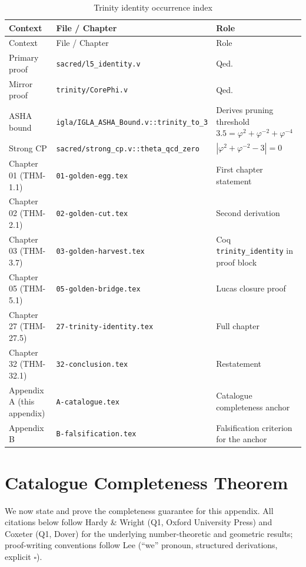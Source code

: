 \begin{longtable}{llp{5.5cm}}
\toprule
Context & File / Chapter & Role \\
\midrule
\endfirsthead
\toprule
Context & File / Chapter & Role \\
\midrule
\endhead
\bottomrule
\endfoot
\bottomrule
\caption{Trinity identity occurrence index}
\endlastfoot
Primary proof &
  \texttt{sacred/l5\_identity.v} & Qed. \\
Mirror proof &
  \texttt{trinity/CorePhi.v} & Qed. \\
ASHA bound &
  \texttt{igla/IGLA\_ASHA\_Bound.v::trinity\_to\_3} &
  Derives pruning threshold $3.5=\varphi^{2}+\varphi^{-2}+\varphi^{-4}$ \\
Strong CP &
  \texttt{sacred/strong\_cp.v::theta\_qcd\_zero} &
  $|\varphi^{2}+\varphi^{-2}-3|=0$ \\
Chapter 01 (THM-1.1) & \texttt{01-golden-egg.tex} & First chapter statement \\
Chapter 02 (THM-2.1) & \texttt{02-golden-cut.tex} & Second derivation \\
Chapter 03 (THM-3.7) & \texttt{03-golden-harvest.tex} &
  Coq \texttt{trinity\_identity} in proof block \\
Chapter 05 (THM-5.1) & \texttt{05-golden-bridge.tex} &
  Lucas closure proof \\
Chapter 27 (THM-27.5) & \texttt{27-trinity-identity.tex} &
  Full chapter \\
Chapter 32 (THM-32.1) & \texttt{32-conclusion.tex} & Restatement \\
Appendix A (this appendix) & \texttt{A-catalogue.tex} &
  Catalogue completeness anchor \\
Appendix B & \texttt{B-falsification.tex} &
  Falsification criterion for the anchor \\
\end{longtable}

\section{Catalogue Completeness Theorem}
\label{sec:A-completeness}

We now state and prove the completeness guarantee for this appendix.
All citations below follow Hardy \& Wright \cite{hardy_wright} (Q1,
Oxford University Press) and Coxeter \cite{coxeter_regular_polytopes}
(Q1, Dover) for the underlying number-theoretic and geometric results;
proof-writing conventions follow Lee \cite{lee_proofs}
(``we'' pronoun, structured derivations, explicit $\square$).


